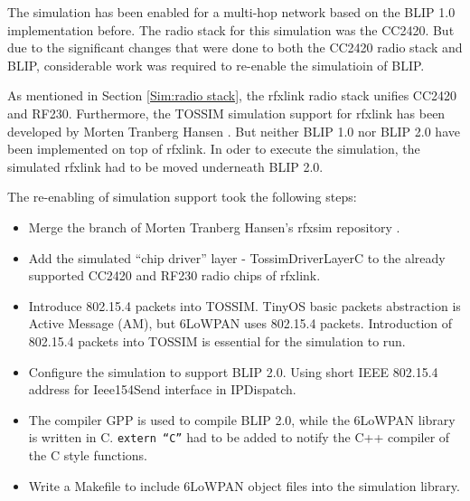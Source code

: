 The simulation has been enabled for a multi-hop network based on the BLIP 1.0 implementation before. The radio stack for this simulation was the CC2420. But due to the significant changes that were done to both the CC2420 radio stack and BLIP, considerable work was required to re-enable the simulatioin of BLIP. 
\newline

As mentioned in Section \ref{Sim:radio stack}, the rfxlink radio stack unifies CC2420 and RF230. Furthermore, the TOSSIM simulation support for rfxlink has been developed by Morten Tranberg Hansen \cite{rfxsim}. But neither BLIP 1.0 nor BLIP 2.0 have been implemented on top of rfxlink. In oder to execute the simulation, the simulated rfxlink had to be moved underneath BLIP 2.0. 
\newline

The re-enabling of simulation support took the following steps: 
\begin{itemize}
\item Merge the branch of Morten Tranberg Hansen's rfxsim repository \cite{rfxsim}. 
\newline

\item Add the simulated ``chip driver'' layer - TossimDriverLayerC to the already supported CC2420 and RF230 radio chips of rfxlink. 
\newline

\item Introduce 802.15.4 packets into TOSSIM. TinyOS basic packets abstraction is Active Message (AM), but 6LoWPAN uses 802.15.4 packets. Introduction of 802.15.4 packets into TOSSIM is essential for the simulation to run.
\newline

\item Configure the simulation to support BLIP 2.0. Using short IEEE 802.15.4 address for Ieee154Send interface in IPDispatch. 
\newline

\item The compiler GPP is used to compile BLIP 2.0, while the 6LoWPAN library is written in C. \texttt{extern ``C''} had to be added to notify the C++ compiler of the C style functions.
\newline

\item Write a Makefile to include 6LoWPAN object files into the simulation library.
\end{itemize}


